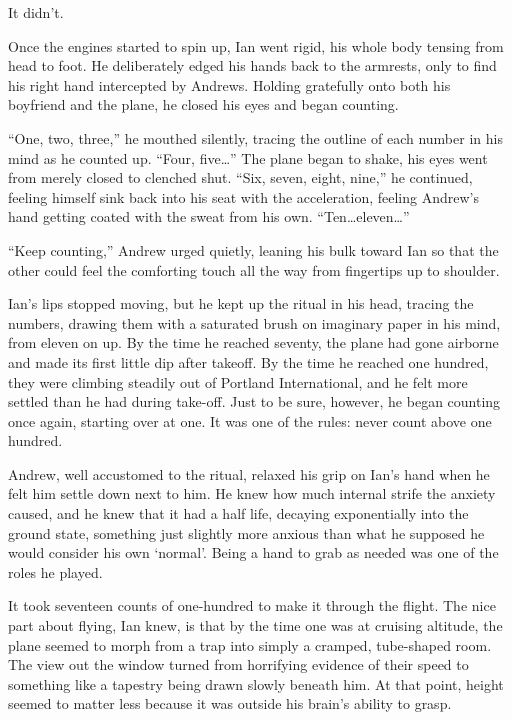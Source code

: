 It didn't.

Once the engines started to spin up, Ian went rigid, his whole body tensing from head to foot. He deliberately edged his hands back to the armrests, only to find his right hand intercepted by Andrews. Holding gratefully onto both his boyfriend and the plane, he closed his eyes and began counting.

``One, two, three,'' he mouthed silently, tracing the outline of each number in his mind as he counted up. ``Four, five\ldots{}'' The plane began to shake, his eyes went from merely closed to clenched shut. ``Six, seven, eight, nine,'' he continued, feeling himself sink back into his seat with the acceleration, feeling Andrew's hand getting coated with the sweat from his own. ``Ten\ldots{}eleven\ldots{}''

``Keep counting,'' Andrew urged quietly, leaning his bulk toward Ian so that the other could feel the comforting touch all the way from fingertips up to shoulder.

Ian's lips stopped moving, but he kept up the ritual in his head, tracing the numbers, drawing them with a saturated brush on imaginary paper in his mind, from eleven on up. By the time he reached seventy, the plane had gone airborne and made its first little dip after takeoff. By the time he reached one hundred, they were climbing steadily out of Portland International, and he felt more settled than he had during take-off. Just to be sure, however, he began counting once again, starting over at one. It was one of the rules: never count above one hundred.

Andrew, well accustomed to the ritual, relaxed his grip on Ian's hand when he felt him settle down next to him. He knew how much internal strife the anxiety caused, and he knew that it had a half life, decaying exponentially into the ground state, something just slightly more anxious than what he supposed he would consider his own `normal'. Being a hand to grab as needed was one of the roles he played.

\secdiv{}

It took seventeen counts of one-hundred to make it through the flight. The nice part about flying, Ian knew, is that by the time one was at cruising altitude, the plane seemed to morph from a trap into simply a cramped, tube-shaped room. The view out the window turned from horrifying evidence of their speed to something like a tapestry being drawn slowly beneath him. At that point, height seemed to matter less because it was outside his brain's ability to grasp.

